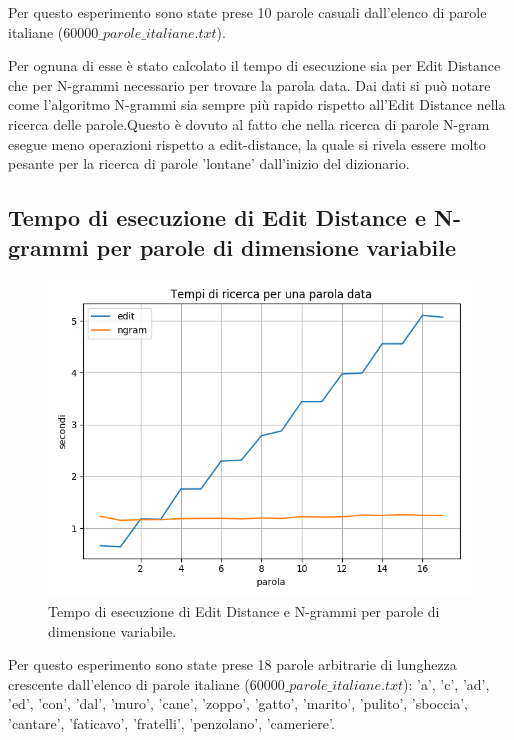 \documentclass[a4paper,12pt]{article}
\begin{document}
Per questo esperimento sono state prese 10 parole casuali dall'elenco di parole italiane ($60000\_parole\_italiane.txt$).

Per ognuna di esse è stato calcolato il tempo di esecuzione sia per Edit Distance che per N-grammi necessario per trovare la parola data.
\newline
\newline
Dai dati si può notare come l'algoritmo N-grammi sia sempre più rapido rispetto all'Edit Distance nella ricerca delle parole.Questo è dovuto al fatto che nella ricerca di parole N-gram esegue meno operazioni rispetto a edit-distance, la quale si rivela essere molto pesante per la ricerca di parole 'lontane' dall'inizio del dizionario.

\clearpage
\subsection{Tempo di esecuzione di Edit Distance e N-grammi per parole di dimensione variabile}
\begin{figure}[h]
    \centering
    \captionsetup{justification=centering,margin=1.05cm}
    \includegraphics[width=1.0\textwidth]{Tempi_di_ricerca_per_una_parola_data}
    \caption{Tempo di esecuzione di Edit Distance e N-grammi per parole di dimensione variabile.}
    \label{fig:test2_1}
\end{figure}
Per questo esperimento sono state prese 18 parole arbitrarie di lunghezza crescente dall'elenco di parole italiane ($60000\_parole\_italiane.txt$): 'a', 'c', 'ad', 'ed', 'con', 'dal', 'muro', 'cane', 'zoppo', 'gatto', 'marito', 'pulito', 'sboccia', 'cantare', 'faticavo', 'fratelli', 'penzolano', 'cameriere'.
\end{document}
